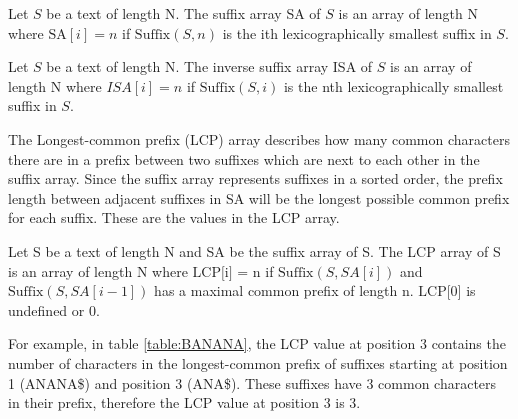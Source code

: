\begin{definition} 

    Let $S$ be a text of length N. The suffix array SA of $S$ is an array of length N where
    $\text{SA}[i] = n$ if $\text{Suffix}(S, n)$ is the ith lexicographically smallest
    suffix in $S$.

\end{definition}

\begin{definition} 

    Let $S$ be a text of length N. The inverse suffix array ISA of $S$ is an array of
    length N where $ISA[i] = n$ if $\text{Suffix}(S, i)$ is the nth lexicographically
    smallest suffix in $S$.

\end{definition}

The Longest-common prefix (LCP) array describes how many common characters there are in a
prefix between two suffixes which are next to each other in the suffix array. Since the
suffix array represents suffixes in a sorted order, the prefix length between adjacent
suffixes in SA will be the longest possible common prefix for each suffix. These are the
values in the LCP array.

\begin{definition} Let S be a text of length N and SA be the suffix array of S.
The LCP array of S is an array of length N where $\text{LCP[i] = n}$ if $\text{Suffix}(S,
SA[i])$ and $\text{Suffix}(S, SA[i - 1])$ has a maximal common prefix of length
$\text{n}$. $\text{LCP[0]}$ is undefined or {0}. \end{definition}

For example, in table \ref{table:BANANA}, the LCP value at position 3 contains the number
of characters in the longest-common prefix of suffixes starting at position 1 (ANANA\$)
and position 3 (ANA\$). These suffixes have 3 common characters in their prefix, therefore
the LCP value at position 3 is 3.

